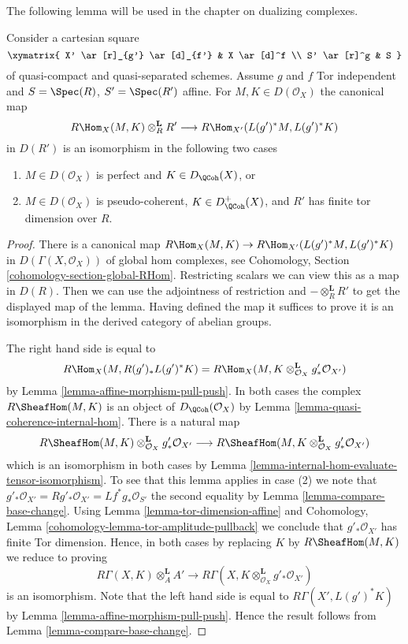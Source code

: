 \noindent
The following lemma will be used in the chapter on dualizing complexes.

\begin{lemma}
\label{lemma-affine-morphism-and-hom-out-of-perfect}
Consider a cartesian square
$$
\xymatrix{
X' \ar[r]_{g'} \ar[d]_{f'} & X \ar[d]^f \\
S' \ar[r]^g & S
}
$$
of quasi-compact and quasi-separated schemes. Assume $g$ and $f$
Tor independent and $S = \Spec(R)$, $S' = \Spec(R')$ affine. For
$M, K \in D(\mathcal{O}_X)$ the canonical map
$$
R\Hom_X(M, K) \otimes^\mathbf{L}_R R'
\longrightarrow
R\Hom_{X'}(L(g')^*M, L(g')^*K)
$$
in $D(R')$ is an isomorphism in the following two cases
\begin{enumerate}
\item $M \in D(\mathcal{O}_X)$ is perfect and $K \in D_\QCoh(X)$, or
\item $M \in D(\mathcal{O}_X)$ is pseudo-coherent,
$K \in D_\QCoh^+(X)$, and $R'$ has finite tor dimension over $R$.
\end{enumerate}
\end{lemma}

\begin{proof}
There is a canonical map
$R\Hom_X(M, K) \to R\Hom_{X'}(L(g')^*M, L(g')^*K)$
in $D(\Gamma(X, \mathcal{O}_X))$ of global hom complexes, see
Cohomology, Section \ref{cohomology-section-global-RHom}.
Restricting scalars we can view this as a map in $D(R)$.
Then we can use the adjointness of restriction and
$- \otimes_R^\mathbf{L} R'$ to get the displayed map of the lemma.
Having defined the map it suffices to prove it is an isomorphism
in the derived category of abelian groups.

\medskip\noindent
The right hand side is equal to
$$
R\Hom_X(M, R(g')_*L(g')^*K) =
R\Hom_X(M, K \otimes_{\mathcal{O}_X}^\mathbf{L} g'_*\mathcal{O}_{X'})
$$
by Lemma \ref{lemma-affine-morphism-pull-push}. In both cases the complex
$R\SheafHom(M, K)$ is an object of $D_\QCoh(\mathcal{O}_X)$ by
Lemma \ref{lemma-quasi-coherence-internal-hom}. There is a natural map
$$
R\SheafHom(M, K) \otimes_{\mathcal{O}_X}^\mathbf{L} g'_*\mathcal{O}_{X'}
\longrightarrow
R\SheafHom(M, K \otimes_{\mathcal{O}_X}^\mathbf{L} g'_*\mathcal{O}_{X'})
$$
which is an isomorphism in both cases by
Lemma \ref{lemma-internal-hom-evaluate-tensor-isomorphism}.
To see that this lemma applies in case (2) we note that
$g'_*\mathcal{O}_{X'} = Rg'_*\mathcal{O}_{X'} =
Lf^*g_*\mathcal{O}_{S'}$ the second equality by
Lemma \ref{lemma-compare-base-change}.
Using Lemma \ref{lemma-tor-dimension-affine} and
Cohomology, Lemma \ref{cohomology-lemma-tor-amplitude-pullback}
we conclude that $g'_*\mathcal{O}_{X'}$ has finite Tor dimension.
Hence, in both cases by replacing $K$ by $R\SheafHom(M, K)$ we reduce
to proving
$$
R\Gamma(X, K) \otimes^\mathbf{L}_A A' \longrightarrow
R\Gamma(X, K \otimes^\mathbf{L}_{\mathcal{O}_X} g'_*\mathcal{O}_{X'})
$$
is an isomorphism.
Note that the left hand side is equal to $R\Gamma(X', L(g')^*K)$
by Lemma \ref{lemma-affine-morphism-pull-push}.
Hence the result follows from
Lemma \ref{lemma-compare-base-change}.
\end{proof}

